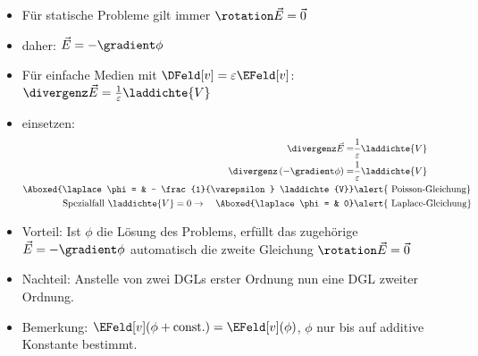       \begin{frame}

        \begin{itemize}[<+->]
        \item Für statische Probleme gilt immer \qquad$\rotation\vec{E} = \vec{0}$
        \item daher: \hspace{4cm} $\vec{E} = - \gradient \phi$
          \item Für \alert{einfache} Medien mit $\DFeld[v] = \varepsilon \EFeld[v]$:\qquad $\divergenz \vec{E} =
            \frac{1}{\varepsilon} \laddichte{V} $
          \item einsetzen:
            \begin{align*}
            \divergenz \vec{E} = &
                             \frac{1}{\varepsilon} \laddichte{V}\\
              \divergenz\left(-\gradient \phi\right) =& \frac{1}{\varepsilon}
                                              \laddichte{V}\\
            \Aboxed{\laplace \phi = & - \frac{1}{\varepsilon}
                                      \laddichte{V}} & \text{\alert{
                                                       Poisson-Gleichung}}\\
              \text{Spezialfall } \laddichte{V}=0 \to\quad \Aboxed{\laplace \phi = & 0} & \text{\alert{
                                                       Laplace-Gleichung}}
            \end{align*}
            \item Vorteil: Ist $\phi$ die Lösung des Problems, erfüllt
              das zugehörige $\vec{E} = - \gradient \phi$ \alert{automatisch} die
              zweite Gleichung $\rotation\vec{E} = \vec{0}$
              \item Nachteil: Anstelle von zwei DGLs erster Ordnung nun
                eine \alert{DGL zweiter Ordnung}.
                \item Bemerkung: $\EFeld[v](\phi + \text{const.}) =
                  \EFeld[v](\phi)$, $\phi$ nur bis auf additive
                  Konstante bestimmt.
          \end{itemize}

        
        \end{frame}

